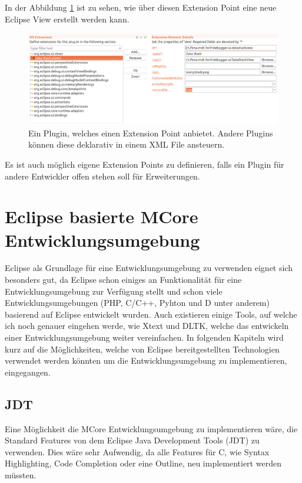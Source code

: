 \newpage
In der Abbildung \ref{fig:extensionpoint} ist zu sehen, wie über diesen Extension Point eine neue Eclipse View erstellt werden kann.
\begin{figure}[H]
	\centering
		\includegraphics[scale=0.25]{platform/extensionpoint2.png}
		\caption{Ein Plugin, welches einen Extension Point anbietet. Andere Plugins können diese deklarativ in einem XML File ansteuern.}
		\label{fig:extensionpoint}
\end{figure}

Es ist auch möglich eigene Extension Points zu definieren, falls ein Plugin für andere Entwickler offen stehen soll für Erweiterungen.

\section{Eclipse basierte MCore Entwicklungsumgebung}

Eclipse als Grundlage für eine Entwicklungsumgebung zu verwenden eignet sich besonders gut, da Eclipse schon einiges an Funktionalität für eine Entwicklungsumgebung zur Verfügung stellt und schon viele Entwicklungsumgebungen (PHP, C/C++, Pyhton und D unter anderem) basierend auf Eclipse entwickelt wurden. Auch existieren einige Tools, auf welche ich noch genauer eingehen werde, wie Xtext und DLTK, welche das entwickeln einer Entwicklungsumgebung weiter vereinfachen. In folgenden Kapiteln wird kurz auf die Möglichkeiten, welche von Eclipse bereitgestellten Technologien verwendet werden könnten um die Entwicklungsumgebung zu implementieren, eingegangen.

\subsection{JDT}
Eine Möglichkeit die MCore Entwicklungsumgebung zu implementieren wäre, die Standard Features von dem Eclipse Java Development Tools (JDT) zu verwenden. Dies wäre sehr Aufwendig, da alle Features für C, wie Syntax Highlighting, Code Completion oder eine Outline, neu implementiert werden müssten.

